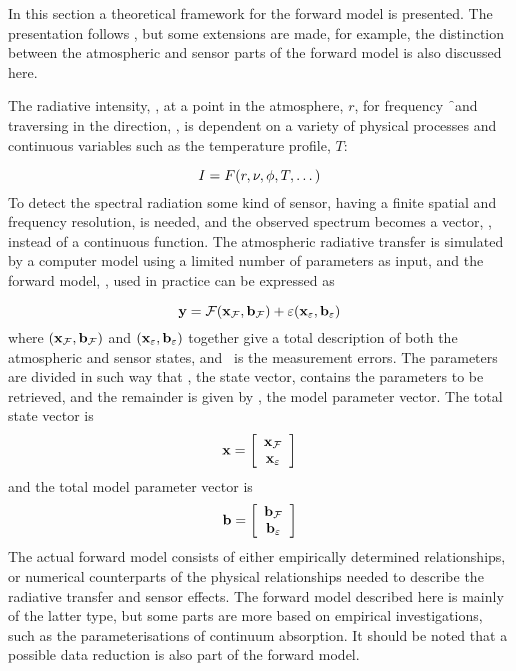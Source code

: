 %
%
In this section a theoretical framework for the forward model is
presented. The presentation follows \citet{rodgers:90}, but some
extensions are made, for example, the distinction between the
atmospheric and sensor parts of the forward model is also discussed
here.



 \label{sec:formalism:fm}
 
 The radiative intensity, \mpbi, at a point in the atmosphere, $r$, for
 frequency \f\ and traversing in the direction, \view, is dependent
 on a variety of physical processes and continuous variables such as
 the temperature profile, $T$:

 \begin{equation}
   I = F(r,\nu,\phi,T,\dots)
 \end{equation} 
 To detect the spectral radiation some kind of sensor, having a finite
 spatial and frequency resolution, is needed, and the observed
 spectrum becomes a vector, \y, instead of a continuous function.
 The atmospheric radiative transfer is simulated by a computer model
 using a limited number of parameters as input, and the forward model,
 \fm, used in practice can be expressed as
 
 \begin{equation}
   \mathbf{y} = \mathcal{F}(\mathbf{x}_{\mathcal{F}},\mathbf{b}_{\mathcal{F}}) + \varepsilon(\mathbf{x}_{\varepsilon},\mathbf{b}_{\varepsilon})
  \label{eq:formalism:fm}
 \end{equation}
 where $(\mathbf{x}_{\mathcal{F}},\mathbf{b}_{\mathcal{F}})$ and $(\mathbf{x}_{\varepsilon},\mathbf{b}_{\varepsilon})$ together give a
 total description of both the atmospheric and sensor states, and
 \merr\ is the measurement errors. The parameters are divided in such
 way that \xt, the state vector, contains the parameters to be
 retrieved, and the remainder is given by \bt, the model parameter
 vector. The total state vector is
 \begin{equation}
   \mathbf{x} = \left[ \begin{array}{c} \mathbf{x}_{\mathcal{F}} \\ \mathbf{x}_{\varepsilon} \end{array} \right]
 \end{equation}
 and the total model parameter vector is
 \begin{equation}
   \mathbf{b} = \left[ \begin{array}{c} \mathbf{b}_{\mathcal{F}} \\ \mathbf{b}_{\varepsilon} \end{array} \right]
 \end{equation}
 The actual forward model consists of either empirically determined
 relationships, or numerical counterparts of the physical
 relationships needed to describe the radiative transfer and sensor
 effects. The forward model described here is mainly of the latter
 type, but some parts are more based on empirical investigations, such
 as the parameterisations of continuum absorption. It should be noted
 that a possible data reduction is also part of the forward model.
  
